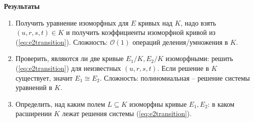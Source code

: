 \documentclass[12pt]{article}
\newcommand{\bigO}{\mathcal{O}}
\theoremstyle{definition}
\theoremstyle{definition}
\theoremstyle{definition}
\begin{document}
            \textbf{Результаты}
            \begin{enumerate}
                \item Получить уравнение изоморфных для $E$ кривых над $K$, надо взять $(u,r,s,t)\in K$ и получить коэффициенты изоморфной кривой из (\ref{eq:e2transition}). \newline
                Сложность: $\bigO(1)$ операций деления/умножения в $K$.
                \item Проверить, являются ли две кривые $E_1/K, E_2/K$ изоморфными: решить (\ref{eq:e2transition}) для неизвестных $(u,r,s,t)$. Если решение в $K$ существует, значит $E_1\cong E_2$. \newline
                Сложность: полиномиальная -- решение системы уравнений в $K$.
                \item Определить, над каким полем $L \subseteq K$ изоморфны кривые $E_1, E_2$: в каком расширении $K$ лежат решения системы (\ref{eq:e2transition}).
            \end{enumerate}
            
	
\end{document}
